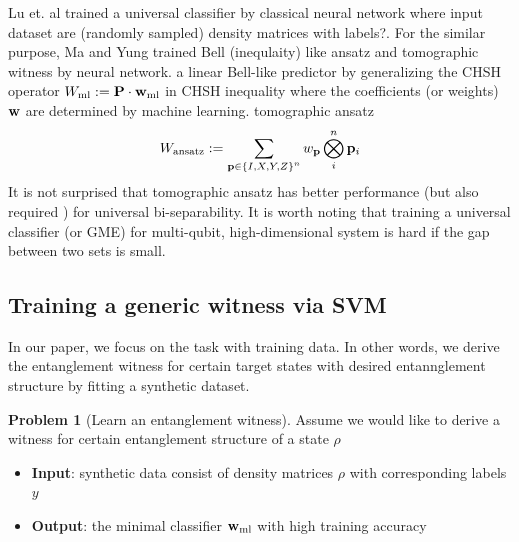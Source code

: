 \documentclass[
reprint,
aps,
pra,
floatfix,
]{revtex4-2}
\theoremstyle{plain}
\theoremstyle{definition}
\newtheorem{problem}{Problem}
\newcommand{\ew}{W}
\newcommand{\dm}{\rho}
\newcommand{\ml}{\text{ml}}
\newcommand{\ansatz}{\textup{ansatz}}
\newcommand{\sx}{\hat{\sigma}_x}
\newcommand{\sy}{\hat{\sigma}_y}
\newcommand{\sz}{\hat{\sigma}_z}
\begin{document}
Lu et. al \cite{luSeparabilityEntanglementClassifierMachine2018} 
trained a universal  classifier by classical neural network
where input dataset are (randomly sampled) density matrices with labels?.
For the similar purpose, Ma and Yung \cite{maTransformingBellInequalities2018} trained Bell (inequlaity) like ansatz and tomographic witness by neural network. 
a linear Bell-like predictor by generalizing the CHSH operator $\ew_{\text{ml}}:=\vb{P}\cdot\vb{w}_{\text{ml}}$ in CHSH inequality where the coefficients (or weights) $\vb{w}$ are determined by machine learning.
tomographic ansatz 
\begin{equation}
	\ew_{\ansatz} := 
	\sum_{\vb{p}\in \qty{I,X,Y,Z}^n} w_{\vb{p}}  
	\bigotimes_i^n 
	\vb{p}_i
	\label{eq:tomographic_ansatz}
\end{equation}
It is not surprised that tomographic ansatz has better performance 
(but also required \cite{luTomographyNecessaryUniversal2016}) for universal bi-separability.
It is worth noting that training a universal classifier (or GME) for multi-qubit, high-dimensional system is hard if the gap between two sets is small.

\subsection{Training a generic witness via SVM}
In our paper, we focus on the task  with training data.
In other words, we derive the entanglement witness for certain target states with desired entannglement structure by fitting a synthetic dataset.
\begin{problem}[Learn an entanglement witness]
	Assume we would like to derive a witness for certain entanglement structure of a state $\dm$
	\begin{itemize}
		\item \textbf{Input}:  synthetic data consist of density matrices $\dm$ with corresponding labels $y$
		\item \textbf{Output}: the minimal classifier $\vbw_{\ml}$ with high training accuracy
	\end{itemize}
\end{problem}
\end{document}
